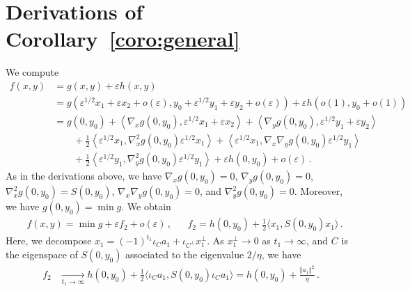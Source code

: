 \documentclass[11pt,english,reqno]{article}
\theoremstyle{plain}
\theoremstyle{definition}
\theoremstyle{remark}
\numberwithin{equation}{section}
\begin{document}
\section{Derivations of Corollary~\ref{coro:general}}
    \label{sec:derivation-coro-general}

        We compute
        \begin{align*}
            f(x,y) &= g(x,y) + \varepsilon h(x,y) \\
            &= g(\varepsilon^{1/2} x_1 + \varepsilon x_2 + o(\varepsilon), y_0 + \varepsilon^{1/2} y_1+ \varepsilon y_2 + o(\varepsilon)) + \varepsilon h(o(1), y_0 + o(1)) \\
            &= g(0,y_0) + \left\langle \nabla_x g(0,y_0) ,\varepsilon^{1/2} x_1 + \varepsilon x_2 \right\rangle + \left\langle \nabla_y g(0,y_0) , \varepsilon^{1/2} y_1 + \varepsilon y_2 \right\rangle \\
            &\qquad+ \frac{1}{2} \left\langle \varepsilon^{1/2} x_1, \nabla^2_x g(0,y_0) \varepsilon^{1/2} x_1 \right\rangle + \left\langle \varepsilon^{1/2} x_1, \nabla_x \nabla_y g(0,y_0) \varepsilon^{1/2} y_1 \right\rangle \\
            &\qquad+ \frac{1}{2} \left\langle \varepsilon^{1/2} y_1, \nabla^2_y g(0,y_0) \varepsilon^{1/2} y_1 \right\rangle + \varepsilon h(0,y_0) + o(\varepsilon) \, . 
        \end{align*}
        As in the derivations above, we have $\nabla_x g(0,y_0) = 0$, $\nabla_y g(0,y_0) = 0$, $\nabla^2_{x} g(0,y_0) = S(0,y_0)$, $\nabla_x \nabla_y g(0,y_0) = 0$, and $\nabla^2_{y} g(0,y_0) = 0$. Moreover, we have $g(0,y_0) = \min g$. We obtain
        \begin{align*}
            &f(x,y) = \min g + \varepsilon f_2 + o(\varepsilon) \, , 
            &&f_2 = h(0,y_0) + \frac{1}{2} \langle x_1, S(0,y_0) x_1 \rangle \, .
        \end{align*}
        Here, we decompose $x_1 = (-1)^{t_1} \iota_C a_1 + \iota_{C^\perp} x_1^\perp$. As $x_1^\perp \to 0$ as $t_1 \to \infty$, and $C$ is the eigenspace of $S(0,y_0)$ associated to the eigenvalue $2/\eta$, we have
        \begin{align*}
            f_2 &\xrightarrow[t_1 \to \infty]{} h(0, y_0) + \frac{1}{2} \langle \iota_Ca_1, S(0,y_0) \iota_C a_1 \rangle =  h(0, y_0) + \frac{\Vert a_1 \Vert^2}{\eta} \, .
        \end{align*}
\end{document}
